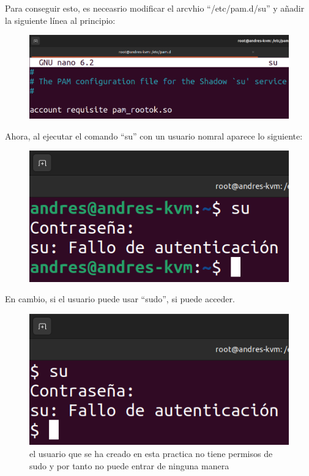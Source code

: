 \documentclass{article}
\begin{document}
Para conseguir esto, es neceasrio modificar el arcvhio ``/etc/pam.d/su'' y añadir la siguiente línea al principio:

\begin{figure}[H]
    \includegraphics[width=\textwidth]{imagenes/sudeny.png}
\end{figure}

Ahora, al ejecutar el comando ``su'' con un usuario nomral aparece lo siguiente:

\begin{figure}[H]
    \includegraphics[width=\textwidth]{imagenes/sudenyuser.png}
\end{figure}


En cambio, si el usuario puede usar ``sudo'', si puede acceder.

\begin{figure}[H]
    \includegraphics[width=\textwidth]{imagenes/sudenyuserprueba.png}
    \caption{el usuario que se ha creado en esta practica no tiene permisos de sudo y por tanto no puede entrar de ninguna manera}
\end{figure}
\end{document}
